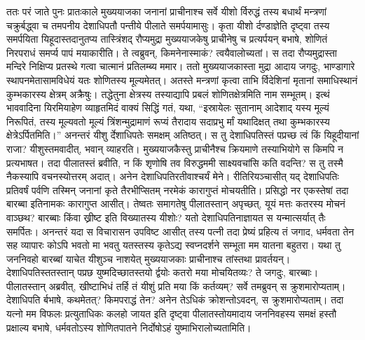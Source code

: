 \adhyAya
{}
\vakya ततः परं जाते पुनः प्रातःकाले मुख्ययाजका जनानां प्राचीनाश्च सर्वे यीशो र्विरुद्धं तस्य बधार्थं मन्त्रणां चक्रुर्बद्ध्वा
\vakya च तमपनीय देशाधिपतौ पन्तीये पीलाते समर्पयामासुः।
\vakya कृता यीशो र्दण्डाज्ञेति दृष्ट्वा तस्य समर्पयिता यिहूदास्तदानुतप्य तास्त्रिंशद् रौप्यमुद्रा मुख्ययाजकेषु प्राचीनेषु च प्रत्यर्पयन् बभाषे,
\vakya शोणितं निरपराधं समर्प्य पापं मयाकारीति। ते त्वब्रुवन्, किमनेनास्माकं? त्वयैवालोच्यतां।
\vakya स तदा रौप्यमुद्रास्ता मन्दिरे निक्षिप्य प्रतस्थे गत्वा चात्मानं प्रतिलम्ब्य ममार।
\vakya ततो मुख्ययाजकास्ता मुद्रा आदाय जगदुः, भाण्डागारे स्थापनमेतासामविधेयं यतः शोणितस्य मूल्यमेतत्।
\vakya अतस्ते मन्त्रणां कृत्वा ताभि र्विदेशिनां मृतानां समाधिस्थानं कुम्भकारस्य क्षेत्रम् अक्रैषुः।
\vakya तद्धेतुना क्षेत्रस्य तस्याद्यापि प्रबलं शोणितक्षेत्रमिति नाम सम्भूतम्।
\vakya इत्थं भाववादिना यिरमियाहेण व्याहृतमिदं वाक्यं सिद्धिं गतं, यथा, “इस्रायेलः सुतानाम् आदेशाद् यस्य मूल्यं निरूपितं, तस्य मूल्यवतो मूल्यं त्रिंशन्मुद्रामाणं रूप्यं
\vakya तैरादाय सदाप्रभु र्मां यथादिक्षत् तथा कुम्भकारस्य क्षेत्रेऽर्पितमिति।”
\vakya अनन्तरं यीशु र्देशाधिपतेः समक्षम् अतिष्ठत्। स तु देशाधिपतिस्तं पप्रच्छ त्वं किं यिहूदीयानां राजा? यीशुस्तमवादीत्, भवान् व्याहरति।
\vakya मुख्ययाजकैस्तु प्राचीनैश्च क्रियमाणे तस्याभियोगे स किमपि न प्रत्यभाषत।
\vakya तदा पीलातस्तं ब्रवीति, न किं शृणोषि तव विरुद्धममी साक्ष्यवचांसि कति वदन्ति?
\vakya स तु तस्मै नैकस्यापि वचनस्योत्तरम् अदात्। अनेन देशाधिपतिरतीवाश्चर्यं मेने।
\vakya रीतिरियञ्चासीत् यद् देशाधिपतिः प्रतिवर्षं पर्वणि तस्मिन् जनानां कृते तैरभीप्सितम् नरमेकं कारागुप्तं मोचयतीति।
\vakya प्रसिद्धो नर एकस्तेषां तदा बारब्बा इतिनामकः कारागुप्त आसीत्।
\vakya तेष्वतः समागतेषु पीलातस्तान् अपृच्छत्, यूयं मत्तः कतरस्य मोचनं वाञ्छथ? बारब्बाः किंवा ख्रीष्ट इति विख्यातस्य यीशोः?
\vakya यतो देशाधिपतिनाज्ञायत स यन्मात्सर्यात् तैः समर्पितः।
\vakya अनन्तरं यदा स विचारासन उपविष्ट आसीत् तस्य पत्नी तदा प्रेष्यं प्रहित्य तं जगाद, धर्मवता तेन सह व्यापारः कोऽपि भवतो मा भवतु यतस्तस्य कृतेऽद्य स्वप्नदर्शने सम्भूता मम यातना बहुतरा।
\vakya यथा तु जननिवहो बारब्बां याचेत यीशुञ्च नाशयेत् मुख्ययाजकाः प्राचीनाश्च तांस्तथा प्रावर्तयन्। 
\vakya देशाधिपतिस्ततस्तान् पप्रछ युष्मदिच्छातस्तयो र्द्वयोः कतरो मया मोचयितव्यः? ते जगदुः, बारब्बाः।
\vakya पीलातस्तान् अब्रवीत्, खीष्टाभिधं तर्हि तं यीशुं प्रति मया किं कर्तव्यम्? सर्वे तमब्रुवन् स क्रुशमारोप्यताम्।
\vakya देशाधिपति र्बभाषे, कथमेतत्? किमपराद्धं तेन? अनेन तेऽधिकं क्रोशन्तोऽवदन्, स क्रुशमारोप्यताम्।
\vakya तदा यत्नो मम विफलः प्रत्युताधिकः कलहो जायत इति दृष्ट्वा पीलातस्तोयमादाय जननिवहस्य समक्षं हस्तौ प्रक्षाल्य बभाषे, धर्मवतोऽस्य शोणितपातने निर्दोषोऽहं युष्माभिरालोच्यतामिति।
